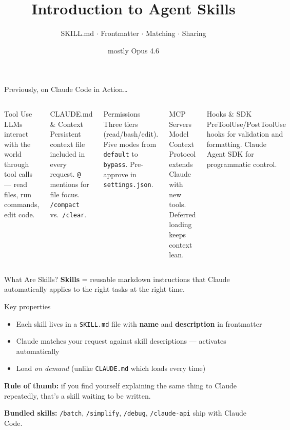 \documentclass[aspectratio=169]{beamer}
\title{Introduction to Agent Skills}
\subtitle{SKILL.md $\cdot$ Frontmatter $\cdot$ Matching $\cdot$ Sharing}
\author{mostly Opus 4.6}
\date{}
\begin{document}
\begin{frame}
\titlepage
\end{frame}

\begin{frame}{Previously, on Claude Code in Action\ldots}
\begin{columns}[T]
\begin{block}{Tool Use}
LLMs interact with the world through tool calls --- read files, run commands, edit code.
\end{block}

\begin{block}{CLAUDE.md \& Context}
Persistent context file included in every request. \texttt{@} mentions for file focus. \texttt{/compact} vs.\ \texttt{/clear}.
\end{block}

\begin{block}{Permissions}
Three tiers (read/bash/edit). Five modes from \texttt{default} to \texttt{bypass}. Pre-approve in \texttt{settings.json}.
\end{block}

\begin{block}{MCP Servers}
Model Context Protocol extends Claude with new tools. Deferred loading keeps context lean.
\end{block}

\begin{block}{Hooks \& SDK}
PreToolUse/PostToolUse hooks for validation and formatting. Claude Agent SDK for programmatic control.
\end{block}
\end{columns}
\end{frame}

\begin{frame}{What Are Skills?}
\textbf{Skills} = reusable markdown instructions that Claude automatically applies to the right tasks at the right time.

\bigskip
\begin{block}{Key properties}
\begin{itemize}
  \item Each skill lives in a \texttt{SKILL.md} file with \textbf{name} and \textbf{description} in frontmatter
  \item Claude matches your request against skill descriptions --- activates automatically
  \item Load \emph{on demand} (unlike \texttt{CLAUDE.md} which loads every time)
\end{itemize}
\end{block}

\bigskip
\textbf{\color{orange1}Rule of thumb:} if you find yourself explaining the same thing to Claude repeatedly, that's a skill waiting to be written.

\smallskip
\textbf{Bundled skills:} \texttt{/batch}, \texttt{/simplify}, \texttt{/debug}, \texttt{/claude-api} ship with Claude Code.
\end{frame}
\end{document}
